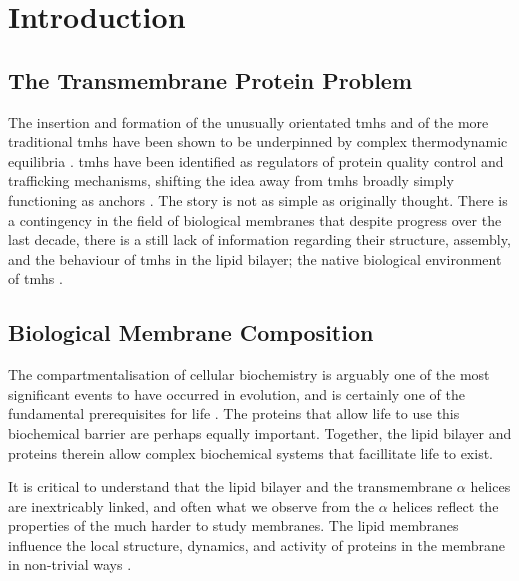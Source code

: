 \chapter{Introduction}


\section{The Transmembrane Protein Problem}

The insertion and formation of the unusually orientated \gls{tmh}s and of the more traditional \gls{tmh}s have been shown to be underpinned by complex thermodynamic equilibria \cite{Cymer2014}. \gls{tmh}s have been identified as regulators of protein quality control and trafficking mechanisms, shifting the idea away from \gls{tmh}s broadly simply functioning as anchors \cite{Hessa2011}. The story is not as simple as originally thought. There is a contingency in the field of biological membranes that despite progress over the last decade, there is a still lack of information regarding their structure, assembly, and the behaviour of \gls{tmh}s in the lipid bilayer; the native biological environment of \gls{tmh}s \cite{Ladokhin2015}.


\section{Biological Membrane Composition}



The compartmentalisation of cellular biochemistry is arguably one of the most significant events to have occurred in evolution, and is certainly one of the fundamental prerequisites for life \cite{Koshland2002}.  The proteins that allow life to use this biochemical barrier are perhaps equally important. Together, the lipid bilayer and proteins therein allow complex biochemical systems that facillitate life to exist.

It is critical to understand that the lipid bilayer and the transmembrane $\alpha$ helices are inextricably linked, and often what we observe from the $\alpha$ helices reflect the properties of the much harder to study membranes. The lipid membranes influence the local structure, dynamics, and activity of proteins in the membrane in non-trivial ways \cite{Bondar2010, Bondar2009, Jardon-Valadez2010, Kalvodova2005, Urban2005, White2001, Jensen2004, Henin2014}.%

